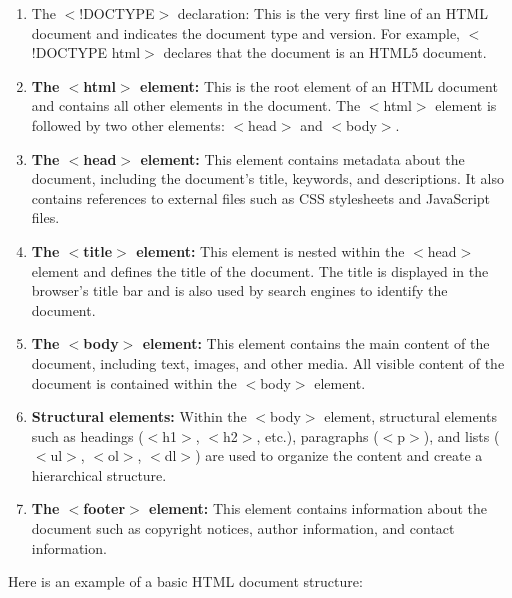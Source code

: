 \documentclass[11pt]{article}
\begin{document}
\begin{enumerate}
    \item The $<$!DOCTYPE$>$ declaration: This is the very first line of an HTML document and indicates the document type and version. For example, $<$!DOCTYPE html$>$ declares that the document is an HTML5 document.

    \item \textbf{The $<$html$>$ element:} This is the root element of an HTML document and contains all other elements in the document. The $<$html$>$ element is followed by two other elements: $<$head$>$ and $<$body$>$.
    
    \item \textbf{The $<$head$>$ element:} This element contains metadata about the document, including the document's title, keywords, and descriptions. It also contains references to external files such as CSS stylesheets and JavaScript files.
    
    \item \textbf{The $<$title$>$ element:} This element is nested within the $<$head$>$ element and defines the title of the document. The title is displayed in the browser's title bar and is also used by search engines to identify the document.
    
    \item \textbf{The $<$body$>$ element:} This element contains the main content of the document, including text, images, and other media. All visible content of the document is contained within the $<$body$>$ element.
    
    \item \textbf{Structural elements:} Within the $<$body$>$ element, structural elements such as headings ($<$h1$>$, $<$h2$>$, etc.), paragraphs ($<$p$>$), and lists ($<$ul$>$, $<$ol$>$, $<$dl$>$) are used to organize the content and create a hierarchical structure.
    
    \item \textbf{The $<$footer$>$ element:} This element contains information about the document such as copyright notices, author information, and contact information.
\end{enumerate}

Here is an example of a basic HTML document structure:

\end{document}
